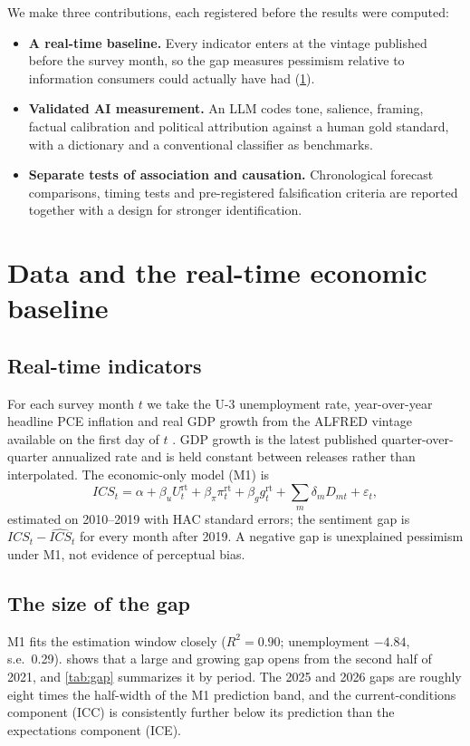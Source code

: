 \documentclass[11pt]{article}
\begin{document}
We make three contributions, each registered before the results were computed:
\begin{itemize}
  \item \textbf{A real-time baseline.} Every indicator enters at the vintage published before the survey month, so the gap measures pessimism relative to information consumers could actually have had (\cref{sec:baseline}).
  \item \textbf{Validated AI measurement.} An LLM codes tone, salience, framing, factual calibration and political attribution against a human gold standard, with a dictionary and a conventional classifier as benchmarks.
  \item \textbf{Separate tests of association and causation.} Chronological forecast comparisons, timing tests and pre-registered falsification criteria are reported together with a design for stronger identification.
\end{itemize}

\section{Data and the real-time economic baseline}\label{sec:baseline}

\subsection{Real-time indicators}
For each survey month $t$ we take the U-3 unemployment rate, year-over-year headline PCE inflation and real GDP growth from the ALFRED vintage available on the first day of $t$ \citep{croushore2001}. GDP growth is the latest published quarter-over-quarter annualized rate and is held constant between releases rather than interpolated. The economic-only model (M1) is
\begin{equation}
  \mathit{ICS}_t = \alpha + \beta_u U^{\mathrm{rt}}_t + \beta_\pi \pi^{\mathrm{rt}}_t + \beta_g g^{\mathrm{rt}}_t + \textstyle\sum_{m} \delta_m D_{mt} + \varepsilon_t ,
  \label{eq:m1}
\end{equation}
estimated on 2010–2019 with HAC standard errors; the sentiment gap is $\mathit{ICS}_t - \widehat{\mathit{ICS}}_t$ for every month after 2019. A negative gap is unexplained pessimism under M1, not evidence of perceptual bias.

\subsection{The size of the gap}
M1 fits the estimation window closely ($R^2 = 0.90$; unemployment $-4.84$, s.e.\ 0.29).  shows that a large and growing gap opens from the second half of 2021, and \cref{tab:gap} summarizes it by period. The 2025 and 2026 gaps are roughly eight times the half-width of the M1 prediction band, and the current-conditions component (ICC) is consistently further below its prediction than the expectations component (ICE).
\end{document}
